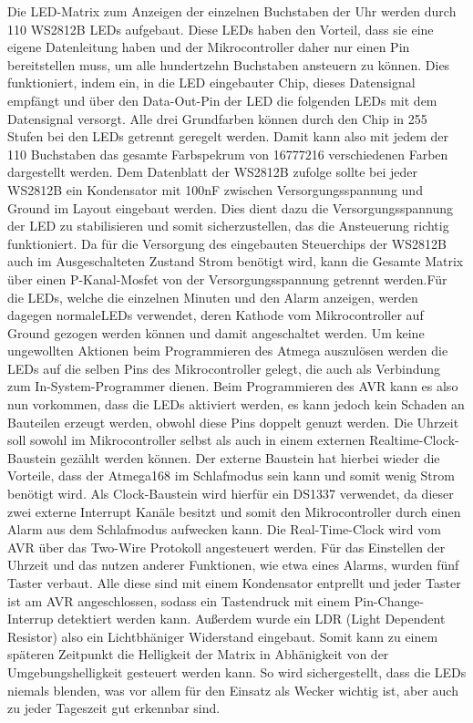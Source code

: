 \documentclass[12pt,journal,compsoc]{IEEEtran}
\begin{document}
Die LED-Matrix zum Anzeigen der einzelnen Buchstaben der Uhr werden durch 110 WS2812B LEDs aufgebaut. Diese LEDs haben den Vorteil, dass sie eine eigene Datenleitung haben und der Mikrocontroller daher nur einen Pin bereitstellen muss, um alle hundertzehn Buchstaben ansteuern zu können. Dies funktioniert, indem ein, in die LED eingebauter Chip, dieses Datensignal empfängt und über den Data-Out-Pin der LED die folgenden LEDs mit dem Datensignal versorgt. Alle drei Grundfarben können durch den Chip in 255 Stufen bei den LEDs getrennt geregelt werden. Damit kann also mit jedem der 110 Buchstaben das gesamte Farbspekrum von 16777216 verschiedenen Farben dargestellt werden. Dem Datenblatt der WS2812B zufolge sollte bei jeder WS2812B ein Kondensator mit 100nF zwischen Versorgungsspannung und Ground im Layout eingebaut werden. Dies dient dazu die Versorgungsspannung der  LED zu stabilisieren und somit sicherzustellen, das die Ansteuerung richtig funktioniert. Da für die Versorgung des eingebauten Steuerchips der WS2812B auch im Ausgeschalteten Zustand Strom benötigt wird, kann die Gesamte Matrix über einen P-Kanal-Mosfet von der Versorgungsspannung getrennt werden.Für die LEDs, welche die einzelnen Minuten und den Alarm anzeigen, werden dagegen \glqq normale\grqq LEDs verwendet, deren Kathode vom Mikrocontroller auf Ground gezogen werden können und damit angeschaltet werden. Um keine ungewollten Aktionen beim Programmieren des Atmega auszulösen werden die LEDs auf die selben Pins des Mikrocontroller gelegt, die auch als Verbindung zum In-System-Programmer dienen. Beim Programmieren des AVR kann es also nun vorkommen, dass  die LEDs aktiviert werden, es kann jedoch kein Schaden an Bauteilen erzeugt werden, obwohl diese Pins doppelt genuzt werden.
Die Uhrzeit soll sowohl im Mikrocontroller selbst als auch in einem externen Realtime-Clock-Baustein gezählt werden können. Der externe Baustein hat hierbei wieder die Vorteile, dass der Atmega168 im Schlafmodus sein kann und somit wenig Strom benötigt wird. Als Clock-Baustein wird hierfür ein DS1337 verwendet, da dieser zwei externe Interrupt Kanäle besitzt und somit den Mikrocontroller durch einen Alarm aus dem Schlafmodus aufwecken kann. Die Real-Time-Clock wird vom AVR über das Two-Wire Protokoll angesteuert werden.
Für das Einstellen der Uhrzeit und das nutzen anderer Funktionen, wie etwa eines Alarms, wurden fünf Taster verbaut. Alle diese sind mit einem Kondensator entprellt und jeder Taster ist am AVR angeschlossen, sodass ein Tastendruck mit einem Pin-Change-Interrup detektiert werden kann. 
Außerdem wurde ein LDR (Light Dependent Resistor) also ein Lichtbhäniger Widerstand eingebaut. Somit kann zu einem späteren Zeitpunkt die Helligkeit der Matrix in Abhänigkeit von der Umgebungshelligkeit gesteuert werden kann. So wird sichergestellt, dass die LEDs niemals blenden, was vor allem für den Einsatz als Wecker wichtig ist, aber auch zu jeder Tageszeit gut erkennbar sind.
\end{document}
